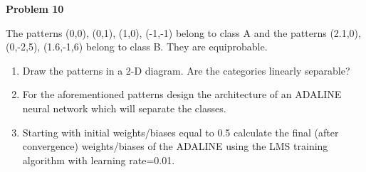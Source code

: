 \documentclass{article}
\begin{document}
\newpage
\noindent \textbf{Problem 10}

\noindent The patterns (0,0), (0,1), (1,0), (-1,-1) belong to class A and the patterns (2.1,0), (0,-2,5),
(1.6,-1,6) belong to class B. They are equiprobable.
\begin{enumerate} [label=\Alph*]
  \item Draw the patterns in a 2-D diagram. Are the categories linearly separable?
  \item For the aforementioned patterns design the architecture of an ADALINE neural network which will separate the classes.
  \item Starting with initial weights/biases equal to 0.5 calculate the final (after convergence) weights/biases of the ADALINE using the LMS training algorithm
        with learning rate=0.01.
\end{enumerate}
\end{document}
